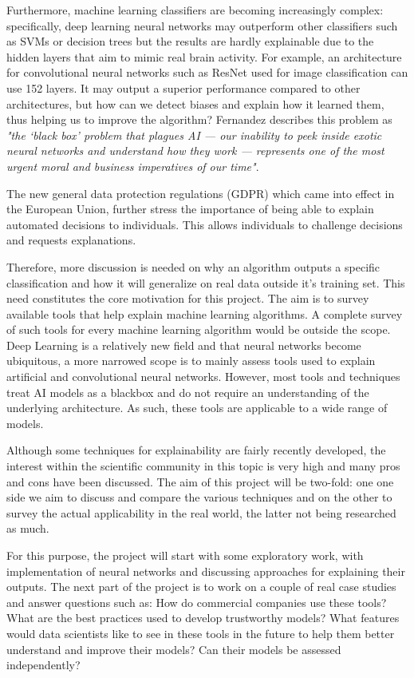 \documentclass[proposal]{softeng}
\begin{document}
Furthermore, machine learning classifiers are becoming increasingly complex: specifically, deep learning neural networks may outperform other classifiers such as SVMs or decision trees but the results are hardly explainable due to the hidden layers that aim to mimic real brain activity. For example, an architecture for convolutional neural networks such as ResNet\cite{res-net} used for image classification can use 152 layers. It may output a superior performance compared to other architectures, but how can we detect biases and explain how it learned them, thus helping us to improve the algorithm?  Fernandez\cite{fernandez-dark-ai} describes this problem as \textit{"the ‘black box’ problem that plagues AI — our inability to peek inside exotic neural networks and understand how they work — represents one of the most urgent moral and business imperatives of our time"}.

The new general data protection regulations (GDPR) which came into effect in the European Union, further stress the importance of being able to explain automated decisions to individuals. This allows individuals to challenge decisions \cite{GoodmanB2017EUro, gdpr} and requests explanations.

Therefore, more discussion is needed on why an algorithm outputs a specific classification and how it will generalize on real data outside it's training set. This need constitutes the core motivation for this project. The aim is to survey available tools that help explain machine learning algorithms. A complete survey of such tools for every machine learning algorithm would be outside the scope. Deep Learning is a relatively new field and that neural networks become ubiquitous, a more narrowed scope is to mainly assess tools used to explain artificial and convolutional neural networks. However, most tools and techniques treat AI models as a blackbox and do not require an understanding of the underlying architecture. As such, these tools are applicable to a wide range of models.

Although some techniques for explainability are fairly recently developed, the interest within the scientific community in this topic is very high and many pros and cons have been discussed. The aim of this project will be two-fold: one one side we aim to discuss and compare the various techniques and on the other to survey the actual applicability in the real world, the latter not being researched as much. 

For this purpose, the project will start with some exploratory work, with implementation of neural networks and discussing approaches for explaining their outputs. The next part of the project is to work on a couple of real case studies and answer questions such as: How do commercial companies use these tools? What are the best practices used to develop trustworthy models? What features would data scientists like to see in these tools in the future to help them better understand and improve their models? Can their models be assessed independently?
\end{document}
